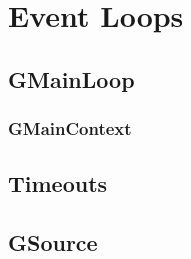\chapter{Event Loops}

\section{GMainLoop}
\subsection{GMainContext}

\section{Timeouts}

\section{GSource}
